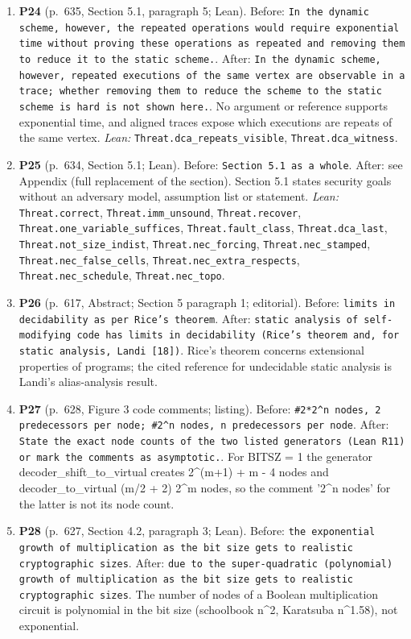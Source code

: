 \documentclass[9pt,twocolumn]{article}
\begin{document}
\begin{enumerate}[label=]
\item \textbf{P24} (p.~635, Section 5.1, paragraph 5; Lean). Before: \texttt{In the dynamic scheme, however, the repeated operations would require exponential time without proving these operations as repeated and removing them to reduce it to the static scheme.}. After: \texttt{In the dynamic scheme, however, repeated executions of the same vertex are observable in a trace; whether removing them to reduce the scheme to the static scheme is hard is not shown here.}. No argument or reference supports exponential time, and aligned traces expose which executions are repeats of the same vertex. \emph{Lean:} \texttt{Threat.dca\_repeats\_visible}, \texttt{Threat.dca\_witness}. 
\item \textbf{P25} (p.~634, Section 5.1; Lean). Before: \texttt{Section 5.1 as a whole}. After: see Appendix (full replacement of the section). Section 5.1 states security goals without an adversary model, assumption list or statement. \emph{Lean:} \texttt{Threat.correct}, \texttt{Threat.imm\_unsound}, \texttt{Threat.recover}, \texttt{Threat.one\_variable\_suffices}, \texttt{Threat.fault\_class}, \texttt{Threat.dca\_last}, \texttt{Threat.not\_size\_indist}, \texttt{Threat.nec\_forcing}, \texttt{Threat.nec\_stamped}, \texttt{Threat.nec\_false\_cells}, \texttt{Threat.nec\_extra\_respects}, \texttt{Threat.nec\_schedule}, \texttt{Threat.nec\_topo}. 
\item \textbf{P26} (p.~617, Abstract; Section 5 paragraph 1; editorial). Before: \texttt{limits in decidability as per Rice's theorem}. After: \texttt{static analysis of self-modifying code has limits in decidability (Rice's theorem and, for static analysis, Landi [18])}. Rice's theorem concerns extensional properties of programs; the cited reference for undecidable static analysis is Landi's alias-analysis result. 
\item \textbf{P27} (p.~628, Figure 3 code comments; listing). Before: \texttt{\#2*2\^{}n nodes, 2 predecessors per node; \#2\^{}n nodes, n predecessors per node}. After: \texttt{State the exact node counts of the two listed generators (Lean R11) or mark the comments as asymptotic.}. For BITSZ = 1 the generator decoder\_shift\_to\_virtual creates 2\^{}(m+1) + m - 4 nodes and decoder\_to\_virtual (m/2 + 2) 2\^{}m nodes, so the comment '2\^{}n nodes' for the latter is not its node count. 
\item \textbf{P28} (p.~627, Section 4.2, paragraph 3; Lean). Before: \texttt{the exponential growth of multiplication as the bit size gets to realistic cryptographic sizes}. After: \texttt{due to the super-quadratic (polynomial) growth of multiplication as the bit size gets to realistic cryptographic sizes}. The number of nodes of a Boolean multiplication circuit is polynomial in the bit size (schoolbook n\^{}2, Karatsuba n\^{}1.58), not exponential. 

\end{enumerate}
\end{document}

